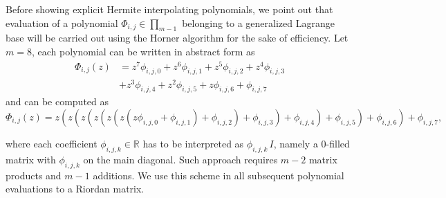 
Before showing explicit Hermite interpolating polynomials, we point out that
evaluation of a polynomial $\Phi_{i,j}\in\prod_{m-1}$ belonging to a
generalized Lagrange base will be carried out using the Horner algorithm for
the sake of efficiency. Let $m=8$, each polynomial can be written in abstract
form as
\begin{displaymath}
\begin{split}
\Phi_{i,j}{\left (z \right )} &= z^{7} \phi_{i,j,0} + z^{6} \phi_{i,j,1} + z^{5} \phi_{i,j,2} + z^{4} \phi_{i,j,3} \\
    &+ z^{3} \phi_{i,j,4} + z^{2} \phi_{i,j,5} + z \phi_{i,j,6} + \phi_{i,j,7}
\end{split}
\end{displaymath}
and can be computed as
\begin{displaymath}
\Phi_{i,j}{\left (z \right )} = z \left(z \left(z \left(z \left(z \left(z \left(z \phi_{i,j,0} + \phi_{i,j,1}\right) + \phi_{i,j,2}\right) + \phi_{i,j,3}\right) + \phi_{i,j,4}\right) + \phi_{i,j,5}\right) + \phi_{i,j,6}\right) + \phi_{i,j,7},
\end{displaymath}
\iffalse
\begin{displaymath}
\begin{array}{lllllll}
\Phi_{i,j}{\left (z \right )} &= z &\left(z\right. & \left(z\right. & \left(z\right. & \left(z\right. & \left(z \left(z \phi_{i,j,0} + \phi_{i,j,1}\right)\right.\\
                              &    &               &                &                &                &\left. + \phi_{i,j,2}\right)\\
                              &    &               &                &                &\left. + \phi_{i,j,3}\right) \\
                              &    &               &                &\left.+ \phi_{i,j,4}\right)\\
                              &    &               &\left. + \phi_{i,j,5}\right)\\
                              &    &\left. + \phi_{i,j,6}\right)\\
                              & + \phi_{i,j,7},
\end{array}
\end{displaymath}
\fi
where each coefficient $\phi_{i,j,k}\in\mathbb{R}$ has to be interpreted as
$\phi_{i,j,k}\,I$, namely a $0$-filled matrix with $\phi_{i,j,k}$ on the main
diagonal. Such approach requires $m-2$ matrix products and $m-1$ additions.  We
use this scheme in all subsequent polynomial evaluations to a Riordan matrix.

